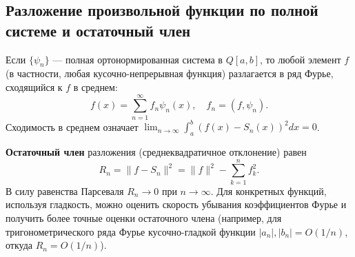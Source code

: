 \documentclass{article}
\theoremstyle{definition}
\begin{document}
\subsection{Разложение произвольной функции по полной системе и остаточный член}
Если $\{\psi_n\}$ — полная ортонормированная система в $Q[a,b]$, то любой элемент $f$ (в частности, любая кусочно-непрерывная функция) разлагается в ряд Фурье, сходящийся к $f$ в среднем:
\[
f(x) = \sum_{n=1}^{\infty} f_n \psi_n(x),\quad f_n=(f,\psi_n).
\]
Сходимость в среднем означает $\lim_{n\to\infty}\int_a^b (f(x)-S_n(x))^2 dx = 0$.

\textbf{Остаточный член} разложения (среднеквадратичное отклонение) равен
\[
R_n = \|f-S_n\|^2 = \|f\|^2 - \sum_{k=1}^n f_k^2.
\]
В силу равенства Парсеваля $R_n\to0$ при $n\to\infty$. Для конкретных функций, используя гладкость, можно оценить скорость убывания коэффициентов Фурье и получить более точные оценки остаточного члена (например, для тригонометрического ряда Фурье кусочно-гладкой функции $|a_n|,|b_n| = O(1/n)$, откуда $R_n = O(1/n)$).
\end{document}
